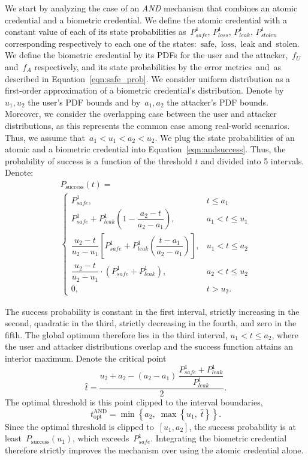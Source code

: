 \documentclass[conference,compsoc]{IEEEtran}
\begin{document}
We start by analyzing the case of an \emph{AND} mechanism that combines an atomic credential and a biometric credential. 
We define the atomic credential with a constant value of each of its state probabilities as~$P^1_{safe}$, $P^1_{loss}$, $P^1_{leak}$, $P^1_{stolen}$ corresponding respectively to each one of the states:~${\text{safe}}$,~${\text{loss}}$,~${\text{leak}}$ and~${\text{stolen}}$. 
We define the biometric credential by its PDFs for the user and the attacker,~$f_U$ and~$f_A$ respectively, and its state probabilities by the error metrics~\FAR and~\FRR as described in Equation~\ref{eqn:safe_prob}. We consider uniform distribution as a first-order approximation of a biometric credential's distribution. Denote by~$u_1, u_2$ the user's PDF bounds and by~$a_1, a_2$ the attacker's PDF bounds. Moreover, we consider the overlapping case between the user and attacker distributions, as this represents the common case among real-world scenarios. Thus, we assume that~$a_1 < u_1 < a_2 < u_2$.
We plug the state probabilities of an atomic and a biometric credential into Equation~\ref{eqn:andsuccess}. Thus, the probability of success is a function of the threshold $t$ and divided into 5 intervals. Denote:
\begin{multline*}
P_{\mathrm{success}}(t)=\\
\begin{cases}
P^1_{safe}, 
& t \le a_1 \\
P^1_{safe} + P^1_{leak}\left(1-\dfrac{a_2 - t}{a_2 - a_1}\right), 
& a_1 < t \le u_1 \\
\dfrac{u_2 - t}{u_2 - u_1}\left[P^1_{safe} + P^1_{leak}\left(\dfrac{t - a_1}{a_2 - a_1}\right)\right],
& u_1 < t \le a_2 \\
\dfrac{u_2 - t}{u_2 - u_1}\cdot(P^1_{safe} + P^1_{leak}),
& a_2 < t \le u_2 \\
0, 
& t > u_2 .
\end{cases}
\end{multline*}

The success probability is constant in the first interval, strictly increasing in the second, quadratic in the third, strictly decreasing in the fourth, and zero in the fifth.
The global optimum therefore lies in the third interval, $u_1 < t \le a_2$, where the user and attacker distributions overlap and the success function attains an interior maximum. Denote the critical point
\begin{equation*}
\hat{t}
=
\frac{
u_2 + a_2
- (a_2 - a_1)\,\dfrac{P^1_{safe} + P^1_{leak}}{P^1_{leak}}
}{2}.
\end{equation*}
The optimal threshold is this point clipped to the interval boundaries,
\begin{equation*}
t_{\text{opt}}^{\mathrm{AND}} = \min\left\{a_2,\;\max\left\{u_1,\;\hat{t}\right\}\right\}.
\end{equation*}
Since the optimal threshold is clipped to~$[u_1, a_2]$, the success probability is at least~$P_{\text{success}}(u_1)$, which exceeds~$P^1_{safe}$. Integrating the biometric credential therefore strictly improves the mechanism over using the atomic credential alone.
\end{document}

